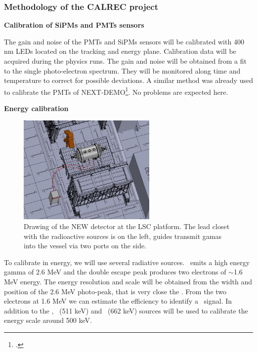\subsubsection*{Methodology of the CALREC project}

%

{\bf Calibration of SiPMs and PMTs sensors}

The gain and noise of the PMTs and SiPMs sensors will be calibrated with 400 nm LEDs located on the tracking and energy plane. 
Calibration data will be acquired during the physics runs.
The gain and noise will be obtained from a fit to the single photo-electron spectrum.
They will be monitored along time and temperature to correct for possible deviations. 
A similar method was already used to calibrate the PMTs of NEXT-DEMO\footcite{Lorca:2014sra}. No problems are expected here.

{\bf Energy calibration}

\begin{figure}
\begin{center}
\includegraphics[width=0.6\textwidth]{src/CALREC/CALREC_LSC_sources.jpg}
\caption{\small Drawing of the NEW detector at the LSC platform. The lead closet with the radioactive sources is on the left,  guides transmit gamas into the vessel via two ports on the side.}
\label{fig:CALREC_LSC_sources}
\end{center}
\end{figure}

To calibrate in energy, we will use several radiative sources.
\Tl ~emits a high energy gamma of 2.6 MeV and the double escape peak produces two electrons of $\sim$1.6 MeV energy.
The energy resolution and scale will be obtained from the width and position of the 2.6 MeV photo-peak, that is very close the \Qbb. 
From the two electrons at 1.6 MeV we can estimate the efficiency to identify a \bb\ signal.  
In addition to the \Tl, \NA ~(511 keV) and \CS ~(662 keV)  sources will be used to calibrate the energy scale around 500 keV. 

